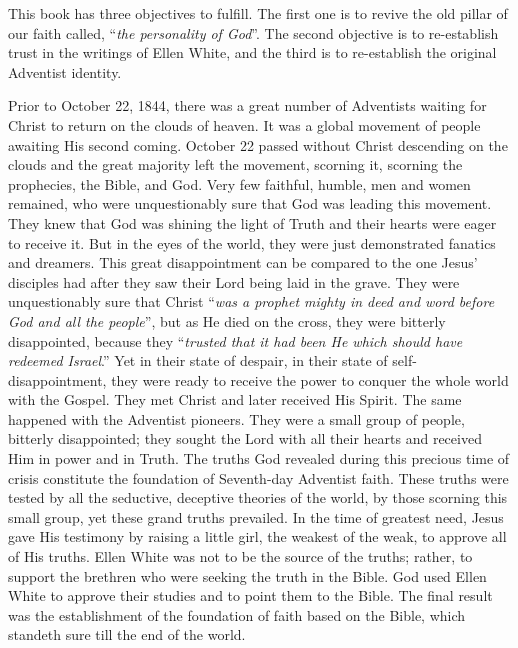 
This book has three objectives to fulfill. The first one is to revive the old pillar of our faith called, “\textit{the personality of God}”. The second objective is to re-establish trust in the writings of Ellen White, and the third is to re-establish the original Adventist identity.

Prior to October 22, 1844, there was a great number of Adventists waiting for Christ to return on the clouds of heaven. It was a global movement of people awaiting His second coming. October 22 passed without Christ descending on the clouds and the great majority left the movement, scorning it, scorning the prophecies, the Bible, and God. Very few faithful, humble, men and women remained, who were unquestionably sure that God was leading this movement. They knew that God was shining the light of Truth and their hearts were eager to receive it. But in the eyes of the world, they were just demonstrated fanatics and dreamers. This great disappointment can be compared to the one Jesus’ disciples had after they saw their Lord being laid in the grave. They were unquestionably sure that Christ “\textit{was a prophet mighty in deed and word before God and all the people}”, but as He died on the cross, they were bitterly disappointed, because they “\textit{trusted that it had been He which should have redeemed Israel}.” Yet in their state of despair, in their state of self-disappointment, they were ready to receive the power to conquer the whole world with the Gospel. They met Christ and later received His Spirit. The same happened with the Adventist pioneers. They were a small group of people, bitterly disappointed; they sought the Lord with all their hearts and received Him in power and in Truth. The truths God revealed during this precious time of crisis constitute the foundation of Seventh-day Adventist faith. These truths were tested by all the seductive, deceptive theories of the world, by those scorning this small group, yet these grand truths prevailed. In the time of greatest need, Jesus gave His testimony by raising a little girl, the weakest of the weak, to approve all of His truths. Ellen White was not to be the source of the truths; rather, to support the brethren who were seeking the truth in the Bible. God used Ellen White to approve their studies and to point them to the Bible. The final result was the establishment of the foundation of faith based on the Bible, which standeth sure till the end of the world.

